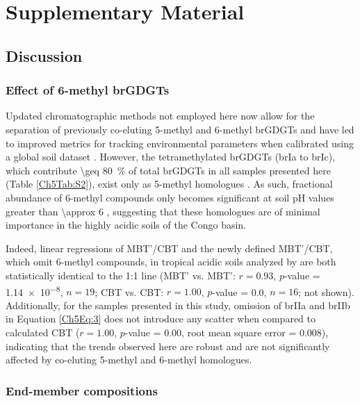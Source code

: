 \clearpage

\section{Supplementary Material}

\subsection{Discussion}

\subsubsection{Effect of 6-methyl brGDGTs}\label{Ch5SD1}

Updated chromatographic methods not employed here now allow for the separation of previously co-eluting 5-methyl and 6-methyl brGDGTs and have led to improved metrics for tracking environmental parameters when calibrated using a global soil dataset \citep{DeJonge:2013cr,DeJonge:2014kw,Hopmans:2016fo}. However, the tetramethylated brGDGTs (brIa to brIc), which contribute \SI{\geq 80}{\%} of total brGDGTs in all samples presented here (Table \ref{Ch5Tab:S2}), exist only as 5-methyl homologues \citep{DeJonge:2013cr}. As such, fractional abundance of 6-methyl compounds only becomes significant at soil pH values greater than \num{\approx 6} \citep{DeJonge:2014kw}, suggesting that these homologues are of minimal importance in the highly acidic soils of the Congo basin. 

Indeed, linear regressions of MBT'/CBT and the newly defined MBT'/CBT, which omit 6-methyl compounds, in tropical acidic soils analyzed by \citet{DeJonge:2014kw} are both statistically identical to the 1:1 line (MBT' vs. MBT': $r = 0.93$, $p$-value = \num{1.14e-8}, $n = 19$; CBT vs. CBT: $r = 1.00$, $p$-value = \num{0.0}, $n = 16$; not shown). Additionally, for the samples presented in this study, omission of brIIa and brIIb in Equation \ref{Ch5Eq:3} does not introduce any scatter when compared to calculated CBT ($r = 1.00$, $p$-value = \num{0.00}, root mean square error = $0.008$), indicating that the trends observed here are robust and are not significantly affected by co-eluting 5-methyl and 6-methyl homologues.

\subsubsection{End-member compositions}\label{Ch5SD2}

